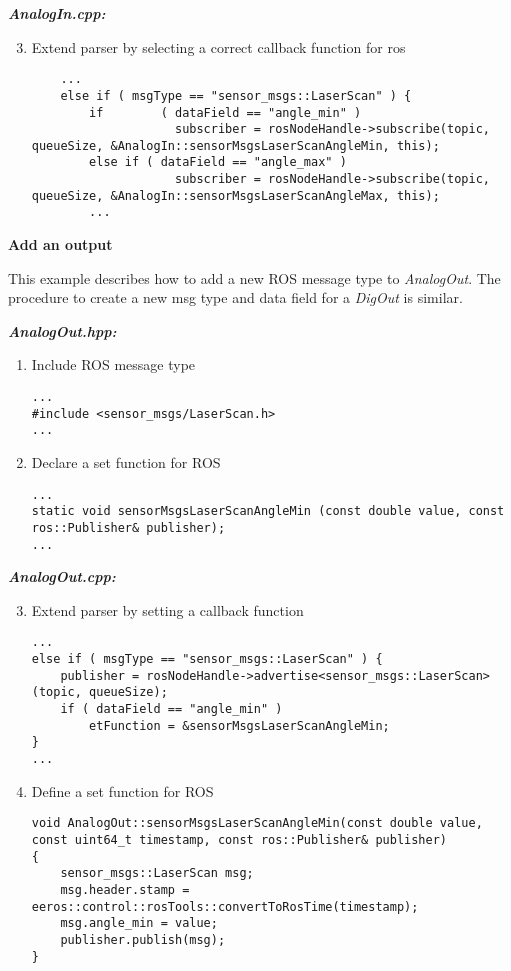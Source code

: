 \textbf{\textit{AnalogIn.cpp:}}
\begin{enumerate}[\hspace{0.5cm}1{.)}]
	\setcounter{enumi}{2}
	\item Extend parser by selecting a correct callback function for ros
	\lstset{language=c}
	\begin{lstlisting}
	...
	else if ( msgType == "sensor_msgs::LaserScan" ) {
		if 		  ( dataField == "angle_min" )
		 			subscriber = rosNodeHandle->subscribe(topic, queueSize, &AnalogIn::sensorMsgsLaserScanAngleMin, this);
		else if ( dataField == "angle_max" )
					subscriber = rosNodeHandle->subscribe(topic, queueSize, &AnalogIn::sensorMsgsLaserScanAngleMax, this);
		...
	\end{lstlisting}
\end{enumerate}


\textbf{Add an output}

This example describes how to add a new ROS message type to \textit{AnalogOut}.
The procedure to create a new msg type and data field for a \textit{DigOut} is similar.

\textbf{\textit{AnalogOut.hpp:}}
\begin{enumerate}[\hspace{0.5cm}1{.)}]
	\item Include ROS message type
	\lstset{language=c}
	\begin{lstlisting}
...
#include <sensor_msgs/LaserScan.h>
...
	\end{lstlisting}
	
	\item Declare a set function for ROS
	\lstset{language=c}
	\begin{lstlisting}
...
static void sensorMsgsLaserScanAngleMin (const double value, const ros::Publisher& publisher);
...
	\end{lstlisting}
\end{enumerate}

\textbf{\textit{AnalogOut.cpp:}}
\begin{enumerate}[\hspace{0.5cm}1{.)}]
	\setcounter{enumi}{2}
	\item Extend parser by setting a callback function
	\lstset{language=c}
	\begin{lstlisting}
...
else if ( msgType == "sensor_msgs::LaserScan" ) {
	publisher = rosNodeHandle->advertise<sensor_msgs::LaserScan>(topic, queueSize);
	if ( dataField == "angle_min" )
		etFunction = &sensorMsgsLaserScanAngleMin;
}
...
	\end{lstlisting}
	
	\item Define a set function for ROS
	\lstset{language=c}
	\begin{lstlisting}
void AnalogOut::sensorMsgsLaserScanAngleMin(const double value, const uint64_t timestamp, const ros::Publisher& publisher)
{
	sensor_msgs::LaserScan msg;
	msg.header.stamp = eeros::control::rosTools::convertToRosTime(timestamp);
	msg.angle_min = value;
	publisher.publish(msg);
}
	\end{lstlisting}
\end{enumerate}


